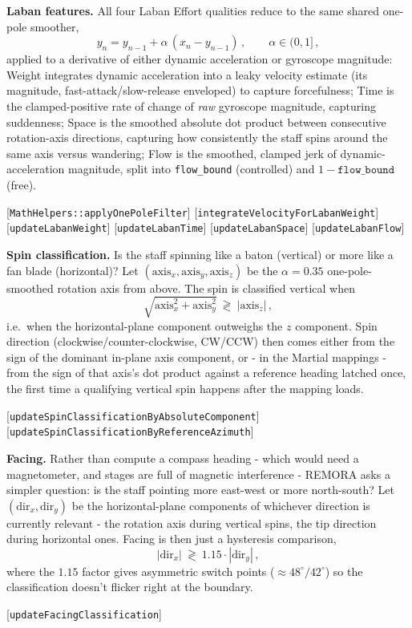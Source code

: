 \documentclass[sigconf,nonacm]{acmart}
\newcommand{\coderef}[1]{{\small [#1]}}
\begin{document}
\textbf{Laban features.} All four Laban Effort qualities reduce to the same shared one-pole
smoother,
\[
y_n = y_{n-1} + \alpha\,(x_n - y_{n-1})\,,\qquad \alpha \in (0,1]\,,
\]
applied to a derivative of either dynamic acceleration or gyroscope magnitude: Weight integrates
dynamic acceleration into a leaky velocity estimate (its magnitude, fast-attack/slow-release
enveloped) to capture forcefulness; Time is the clamped-positive rate of change of \emph{raw}
gyroscope magnitude, capturing suddenness; Space is the smoothed absolute dot product between
consecutive rotation-axis directions, capturing how consistently the staff spins around the same
axis versus wandering; Flow is the smoothed, clamped jerk of dynamic-acceleration magnitude, split
into \texttt{flow\_bound} (controlled) and $1-\texttt{flow\_bound}$ (free).
\begin{flushright}
\coderef{\texttt{MathHelpers::applyOnePoleFilter}}
\coderef{\texttt{integrateVelocityForLabanWeight}}
\coderef{\texttt{updateLabanWeight}}
\coderef{\texttt{updateLabanTime}}
\coderef{\texttt{updateLabanSpace}}
\coderef{\texttt{updateLabanFlow}}
\end{flushright}

\textbf{Spin classification.} Is the staff spinning like a baton (vertical) or more like a fan blade
(horizontal)? Let $(\mathrm{axis}_x,\mathrm{axis}_y,\mathrm{axis}_z)$ be the $\alpha{=}0.35$
one-pole-smoothed rotation axis from above. The spin is classified vertical when
\[
\sqrt{\mathrm{axis}_x^2 + \mathrm{axis}_y^2}\ \gtrless\ |\mathrm{axis}_z|\,,
\]
i.e.\ when the horizontal-plane component outweighs the $z$ component. Spin direction
(clockwise/counter-clockwise, CW/CCW) then
comes either from the sign of the dominant in-plane axis component, or - in the Martial mappings -
from the sign of that axis's dot product against a reference heading latched once, the first time a
qualifying vertical spin happens after the mapping loads.
\begin{flushright}
\coderef{\texttt{updateSpinClassificationByAbsoluteComponent}}
\coderef{\texttt{updateSpinClassificationByReferenceAzimuth}}
\end{flushright}

\textbf{Facing.} Rather than compute a compass heading - which would need a magnetometer, and stages
are full of magnetic interference - REMORA asks a simpler question: is the staff pointing more
east-west or more north-south? Let $(\mathrm{dir}_x,\mathrm{dir}_y)$ be the horizontal-plane
components of whichever direction is currently relevant - the rotation axis during vertical spins,
the tip direction during horizontal ones. Facing is then just a hysteresis comparison,
\[
|\mathrm{dir}_x| \ \gtrless\ 1.15\cdot|\mathrm{dir}_y|\,,
\]
where the $1.15$ factor gives asymmetric switch points ($\approx\!48^\circ/42^\circ$) so the
classification doesn't flicker right at the boundary.
\begin{flushright}
\coderef{\texttt{updateFacingClassification}}
\end{flushright}
\end{document}
